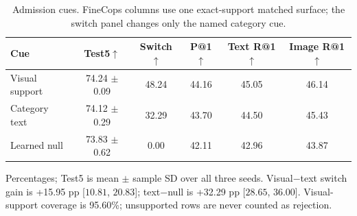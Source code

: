 \begin{table}[t]
\centering
\caption{Admission cues.  FineCops columns use one exact-support matched
surface; the switch panel changes only the named category cue.}
\label{tab:admission}
\scriptsize
\setlength{\tabcolsep}{0.8pt}
\begin{tabular}{lccccc}
\toprule
Cue & Test5$\uparrow$ & Switch$\uparrow$ & P@1$\uparrow$ & Text R@1$\uparrow$ & Image R@1$\uparrow$ \\
\midrule
Visual support & 74.24 $\pm$ 0.09 & 48.24 & 44.16 & 45.05 & 46.14 \\
Category text & 74.12 $\pm$ 0.29 & 32.29 & 43.70 & 44.50 & 45.43 \\
Learned null & 73.83 $\pm$ 0.62 & 0.00 & 42.11 & 42.96 & 43.87 \\
\bottomrule
\end{tabular}
\vspace{2pt}
\parbox{0.98\columnwidth}{\scriptsize Percentages; Test5 is mean $\pm$
sample SD over all three seeds. Visual$-$text switch gain is
+15.95 pp
[$10.81$, $20.83$];
text$-$null is +32.29 pp
[$28.65$, $36.00$]. Visual-support
coverage is 95.60\%; unsupported rows are never counted as rejection.}
\end{table}
